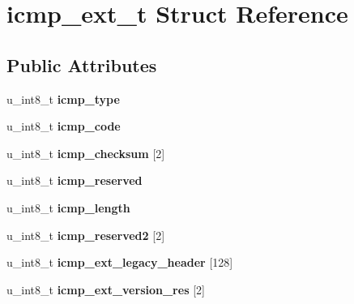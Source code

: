 \hypertarget{structicmp__ext__t}{
\section{icmp\_\-ext\_\-t Struct Reference}
\label{structicmp__ext__t}
}
\subsection*{Public Attributes}
\begin{DoxyCompactItemize}
\item 
\hypertarget{structicmp__ext__t_a8f34fc321808d2292b9bffb712bc16cb}{
u\_\-int8\_\-t {\bfseries icmp\_\-type}}
\label{structicmp__ext__t_a8f34fc321808d2292b9bffb712bc16cb}

\item 
\hypertarget{structicmp__ext__t_a2c7e7c2ae80d866f5d6660cf6b23a835}{
u\_\-int8\_\-t {\bfseries icmp\_\-code}}
\label{structicmp__ext__t_a2c7e7c2ae80d866f5d6660cf6b23a835}

\item 
\hypertarget{structicmp__ext__t_ac94eb8299dce666fe4e0b46c4acf4bf7}{
u\_\-int8\_\-t {\bfseries icmp\_\-checksum} \mbox{[}2\mbox{]}}
\label{structicmp__ext__t_ac94eb8299dce666fe4e0b46c4acf4bf7}

\item 
\hypertarget{structicmp__ext__t_a6e563905fe59381eca917e68347db785}{
u\_\-int8\_\-t {\bfseries icmp\_\-reserved}}
\label{structicmp__ext__t_a6e563905fe59381eca917e68347db785}

\item 
\hypertarget{structicmp__ext__t_aaba4aaa871ca836d0b224b53ca0bf4d7}{
u\_\-int8\_\-t {\bfseries icmp\_\-length}}
\label{structicmp__ext__t_aaba4aaa871ca836d0b224b53ca0bf4d7}

\item 
\hypertarget{structicmp__ext__t_a952944ed3b1f8783c3a2acfa2d074e13}{
u\_\-int8\_\-t {\bfseries icmp\_\-reserved2} \mbox{[}2\mbox{]}}
\label{structicmp__ext__t_a952944ed3b1f8783c3a2acfa2d074e13}

\item 
\hypertarget{structicmp__ext__t_aaf7fa1b5d8fd5a8577cbdc27112248ca}{
u\_\-int8\_\-t {\bfseries icmp\_\-ext\_\-legacy\_\-header} \mbox{[}128\mbox{]}}
\label{structicmp__ext__t_aaf7fa1b5d8fd5a8577cbdc27112248ca}

\item 
\hypertarget{structicmp__ext__t_ac12453ccf9be9b74a76d73595d0ed5b3}{
u\_\-int8\_\-t {\bfseries icmp\_\-ext\_\-version\_\-res} \mbox{[}2\mbox{]}}
\label{structicmp__ext__t_ac12453ccf9be9b74a76d73595d0ed5b3}


\end{DoxyCompactItemize}

